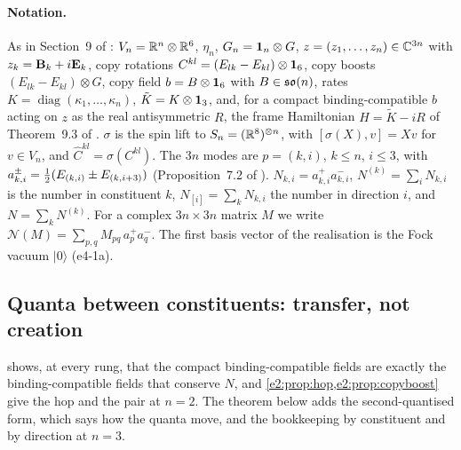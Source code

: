 \paragraph{Notation.} As in Section~9 of \cite{RE}: $V_n=\mathbb{R}^n\otimes\mathbb{R}^6$, $\eta_n$, $G_n=\mathbf 1_n\otimes G$, $z=(z_1,\dots,z_n)\in\mathbb{C}^{3n}$ with
$z_k=\mathbf B_k+i\mathbf E_k$, copy rotations $C^{kl}=(E_{lk}-E_{kl})\otimes\mathbf 1_6$, copy boosts $(E_{lk}-E_{kl})\otimes G$, copy field $b=B\otimes\mathbf 1_6$ with
$B\in\mathfrak{so}(n)$, rates $K=\operatorname{diag}(\kappa_1,\dots,\kappa_n)$, $\tilde K=K\otimes\mathbf 1_3$, and, for a compact binding-compatible $b$ acting on $z$ as the
real antisymmetric $R$, the frame Hamiltonian $H=\tilde K-iR$ of Theorem~9.3 of \cite{RE}. $\sigma$ is the spin lift to
$S_n=(\mathbb{R}^8)^{\otimes n}$, with $[\sigma(X),v]=Xv$ for $v\in V_n$, and $\hat C^{kl}=\sigma(C^{kl})$. The $3n$ modes are $p=(k,i)$, $k\le n$, $i\le3$, with
$a^\pm_{k,i}=\tfrac12(E_{(k,i)}\pm E_{(k,i+3)})$ (Proposition~7.2 of \cite{RE}). $N_{k,i}=a^+_{k,i}a^-_{k,i}$, $N^{(k)}=\sum_iN_{k,i}$ is the number in
constituent $k$, $N_{[i]}=\sum_kN_{k,i}$ the number in direction $i$, and $N=\sum_kN^{(k)}$. For a complex $3n\times3n$ matrix $M$ we write
$\mathcal N(M)=\sum_{p,q}M_{pq}\,a^+_pa^-_q$. The first basis vector of the realisation is the Fock vacuum $|0\rangle$ (e4-1a).

\subsection{Quanta between constituents: transfer, not creation}
\label{e4:sec:fock}

 shows, at every rung, that the compact binding-compatible fields are exactly the binding-compatible fields that
conserve $N$, and \cref{e2:prop:hop,e2:prop:copyboost} give the hop and the pair at $n=2$. The theorem below adds the second-quantised form,
which says how the quanta move, and the bookkeeping by constituent and by direction at $n=3$.

